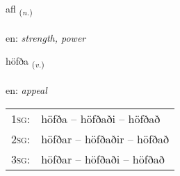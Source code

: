 \documentclass[frontgrid, backgrid]{flacards}\usepackage[]{graphicx}\usepackage[]{color}
\begin{document}
\renewcommand{\flhead}{\vskip5pt \fboxsep=0pt {\small\bfseries\footnotesize Nafnorð | Noun}}
\renewcommand{\fcfoot}{\vskip5pt \fboxsep=0pt \hspace{2pt}{\small\bfseries\footnotesize 2K}}

\renewcommand{\blhead}{\vskip5pt {\small\bfseries\footnotesize Nafnorð | Noun }}
\renewcommand{\bcfoot}{\vskip5pt \hspace{2pt}{\small\bfseries\footnotesize 2K}}


{afl \small{\textsubscript{(\textit{n.})}} \\[1ex] %
\textphonetic{[apl̥]} \\
en: \emph{strength, power} \\  [2ex]
\renewcommand*{\arraystretch}{0.8}
}

\renewcommand{\flhead}{\vskip5pt \fboxsep=0pt {\small\bfseries\footnotesize Sagnorð | Verb}}
\renewcommand{\fcfoot}{\vskip5pt \fboxsep=0pt \hspace{2pt}{\small\bfseries\footnotesize 2K}}

\renewcommand{\blhead}{\vskip5pt {\small\bfseries\footnotesize Sagnorð | Verb }}
\renewcommand{\bcfoot}{\vskip5pt \hspace{2pt}{\small\bfseries\footnotesize 2K}}


{höfða \small{\textsubscript{(\textit{v.})}} \\[1ex] %
\textphonetic{[hœvða]} \\
en: \emph{appeal} \\  [2ex]
\renewcommand*{\arraystretch}{0.8}
\begin{tabular}{p{1cm}l}
\textsc{1sg}: & höfða -- höfðaði -- höfðað \\ 
\textsc{2sg}: & höfðar -- höfðaðir -- höfðað \\ 
\textsc{3sg}: & höfðar -- höfðaði -- höfðað \\ 
\end{tabular}
}
\end{document}
